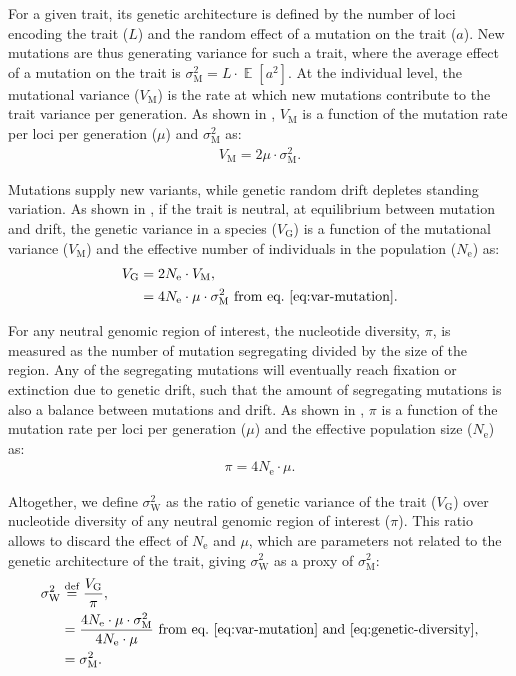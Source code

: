 \documentclass{article}
\newcommand{\defEqual}{\stackrel{\text{def}}{=}}
\newcommand{\Multiply}{\cdot}
\DeclareMathOperator{\E}{\mathbb{E}}
\newcommand{\Ne}{N_{\text{e}}}
\newcommand{\MutationRate}{\mu}
\newcommand{\NbrLoci}{L}
\newcommand{\VarGenetic}{V_{\mathrm{G}}}
\newcommand{\VarMutation}{V_{\mathrm{M}}}
\newcommand{\RateMut}{\sigma^2_{\mathrm{M}}}
\newcommand{\RateWhithin}{\sigma^2_{\mathrm{W}}}
\begin{document}
For a given trait, its genetic architecture is defined by the number of loci encoding the trait ($\NbrLoci$) and the random effect of a mutation on the trait ($a$).
New mutations are thus generating variance for such a trait, where the average effect of a mutation on the trait is $\RateMut = \NbrLoci \Multiply  \E [a^2]$.
At the individual level, the mutational variance ($\VarMutation$) is the rate at which new mutations contribute to the trait variance per generation.
As shown in \textcite{lande_quantitative_1979, lande_sexual_1980}, $\VarMutation$ is a function of the mutation rate per loci per generation ($\MutationRate$) and $\RateMut$ as:
\begin{gather}
    \VarMutation = 2 \MutationRate \Multiply \RateMut \label{eq:var-mutation}.
\end{gather}

Mutations supply new variants, while genetic random drift depletes standing variation.
As shown in \textcite{lynch_mutation_1998}, if the trait is neutral, at equilibrium between mutation and drift, the genetic variance in a species ($\VarGenetic$) is a function of the mutational variance ($\VarMutation$) and the effective number of individuals in the population ($\Ne$) as:
\begin{align}
    \VarGenetic & =  2 \Ne \Multiply \VarMutation, \\
    & = 4 \Ne \Multiply \MutationRate \Multiply \RateMut \text{ from eq.~\ref{eq:var-mutation}}\label{eq:var-genetic}.
\end{align}

For any neutral genomic region of interest, the nucleotide diversity, $\pi$, is measured as the number of mutation segregating divided by the size of the region.
Any of the segregating mutations will eventually reach fixation or extinction due to genetic drift, such that the amount of segregating mutations is also a balance between mutations and drift.
As shown in \textcite{tajima_statistical_1989}, $\pi$ is a function of the mutation rate per loci per generation ($\MutationRate$) and the effective population size ($\Ne$) as:
\begin{gather}
    \pi = 4 \Ne \Multiply \MutationRate \label{eq:genetic-diversity}.
\end{gather}

Altogether, we define $\RateWhithin$ as the ratio of genetic variance of the trait ($\VarGenetic$) over nucleotide diversity of any neutral genomic region of interest ($\pi$).
This ratio allows to discard the effect of $\Ne$ and $\MutationRate$, which are parameters not related to the genetic architecture of the trait, giving $\RateWhithin$ as a proxy of $\RateMut$:
\begin{align}
    \RateWhithin & \defEqual \frac{\VarGenetic }{\pi}, \\
    & = \frac{4 \Ne \Multiply \MutationRate \Multiply \RateMut}{4 \Ne \Multiply \MutationRate} \text{ from eq.~\ref{eq:var-mutation} and~\ref{eq:genetic-diversity}}, \\
    & = \RateMut. \label{eq:rate-pop}
\end{align}
\end{document}
